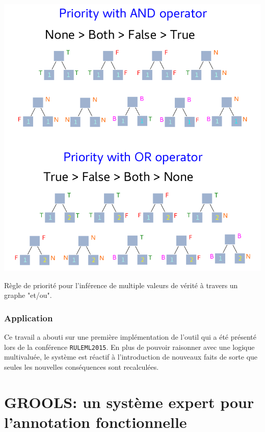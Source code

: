 \begin{refsegment}
\begin{shadedfigure}[H]
    \centering
    \includegraphics[width=\textwidth]{img/four_values_priorities_rules.pdf}
    \caption{ Règle de priorité pour l'inférence de multiple valeurs de vérité à travers un graphe "et/ou". }
    \label{fig:four_truth_values}
\end{shadedfigure}


\subsection{Application}
Ce travail a abouti sur une première implémentation de l'outil qui a été présenté lors de la conférence \texttt{RULEML2015}. En plus de pouvoir raisonner avec une logique multivaluée, le système est réactif à l'introduction de nouveaux faits de sorte que seules les nouvelles conséquences sont recalculées.

\cleardoublepage


\chapter{GROOLS: un système expert pour l'annotation fonctionnelle}


\end{refsegment}

